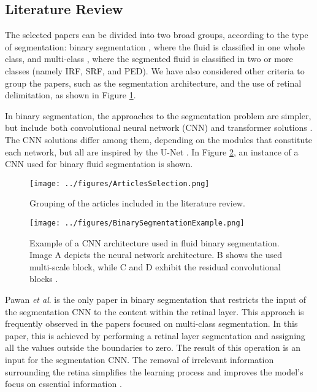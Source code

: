 \subsection{Literature Review}\label{FluidSegmentationLiteratureReview}
The selected papers \cite{Pawan2021, Liu2021, Guo2020, Wu2023, Wang2021, Quek2022, Mantel2021, Li2023, Hassan2021a, Padilla2022, Liu2024, Zhang2023, Tang2022, Xing2022, Rahil2023, Lu2019, Hassan2021b, Hu2019, Sappa2021, Gao2019} can be divided into two broad groups, according to the type of segmentation: binary segmentation \cite{Quek2022, Pawan2021, Liu2021, Guo2020, Wang2021, Wu2023}, where the fluid is classified in one whole class, and multi-class \cite{Rahil2023, Hassan2021a, Zhang2023, Sappa2021, Xing2022, Tang2022, Padilla2022, Hu2019, Mantel2021, Liu2024, Li2023, Gao2019, Hassan2021b, Lu2019}, where the segmented fluid is classified in two or more classes (namely IRF, SRF, and PED). We have also considered other criteria to group the papers, such as the segmentation architecture, and the use of retinal delimitation, as shown in Figure \ref{fig:ArticlesSelection}.
\par
In binary segmentation, the approaches to the segmentation problem are simpler, but include both convolutional neural network (CNN) \cite{Pawan2021, Liu2021, Guo2020, Wang2021, Wu2023} and transformer solutions \cite{Quek2022}. The CNN solutions differ among them, depending on the modules that constitute each network, but all are inspired by the U-Net \cite{Ronneberger2015}. In Figure \ref{fig:BinarySegmentationExample}, an instance of a CNN used for binary fluid segmentation is shown.
\begin{figure}[!ht]
	\centering
	\texttt{[image: ../figures/ArticlesSelection.png]}
	\caption{Grouping of the articles included in the literature review.}
	\label{fig:ArticlesSelection}
\end{figure}
\begin{figure}[!ht]
	\centering
	\texttt{[image: ../figures/BinarySegmentationExample.png]}
	\caption{Example of a CNN architecture used in fluid binary segmentation. Image A depicts the neural network architecture. B shows the used multi-scale block, while C and D exhibit the residual convolutional blocks \cite{Guo2020}.}
	\label{fig:BinarySegmentationExample}
\end{figure}
\par
Pawan \textit{et al}. \cite{Pawan2021} is the only paper in binary segmentation that restricts the input of the segmentation CNN to the content within the retinal layer. This approach is frequently observed in the papers focused on multi-class segmentation. In this paper, this is achieved by performing a retinal layer segmentation and assigning all the values outside the boundaries to zero. The result of this operation is an input for the segmentation CNN. The removal of irrelevant information surrounding the retina simplifies the learning process and improves the model's focus on essential information \cite{Mantel2021}.
